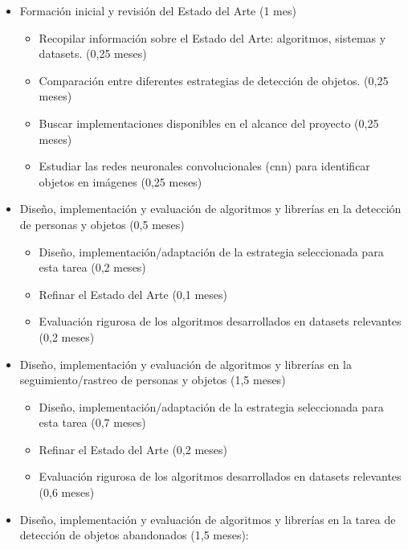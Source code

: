 \begin{itemize}
    \item Formación inicial y revisión del Estado del Arte (1 mes)
  
    \begin{itemize}
        \item Recopilar información sobre el Estado del Arte: algoritmos, sistemas y datasets. (0,25 meses)
        \item Comparación entre diferentes estrategias de detección de objetos. (0,25 meses)
        \item Buscar implementaciones disponibles en el alcance del proyecto (0,25 meses)
        \item Estudiar las redes neuronales convolucionales (\gls{cnn}) para identificar objetos en imágenes (0,25 meses)
    \end{itemize}
  
    \item Diseño, implementación y evaluación de algoritmos y librerías en la detección de personas y objetos (0,5 meses)
  
    \begin{itemize}
        \item Diseño, implementación/adaptación de la estrategia seleccionada para esta tarea (0,2 meses)
        \item Refinar el Estado del Arte (0,1 meses)
        \item Evaluación rigurosa de los algoritmos desarrollados en datasets relevantes (0,2 meses)
    \end{itemize}
  
    \item Diseño, implementación y evaluación de algoritmos y librerías en la seguimiento/rastreo de personas y objetos (1,5 meses)
  
    \begin{itemize}
        \item Diseño, implementación/adaptación de la estrategia seleccionada para esta tarea (0,7 meses)
        \item Refinar el Estado del Arte (0,2 meses)
        \item Evaluación rigurosa de los algoritmos desarrollados en datasets relevantes (0,6 meses)
    \end{itemize}

    \item Diseño, implementación y evaluación de algoritmos y librerías en la tarea de detección de objetos abandonados (1,5 meses):
  

\end{itemize}
